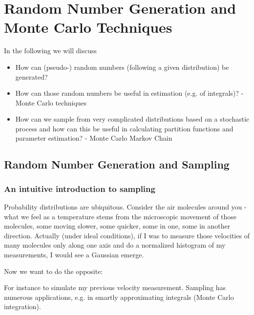 \section{Random Number Generation and Monte Carlo Techniques}
\thispagestyle{plain}

In the following we will discuss
\begin{itemize}
    \item How can (pseudo-) random numbers (following a given distribution) be generated?
    \item How can those random numbers be useful in estimation (e.g. of integrals)? - Monte Carlo techniques
    \item How can we sample from very complicated distributions based on a stochastic process and how
    can this be useful in calculating partition functions and parameter estimation? - Monte Carlo Markov Chain
\end{itemize}

\subsection{Random Number Generation and Sampling}

\subsubsection{An intuitive introduction to sampling}
Probability distributions are ubiquitous. Consider the air molecules around you - what we feel as a temperature stems from the microscopic movement of those
molecules, some moving slower, some quicker, some in one, some in another direction. Actually (under ideal conditions), if I was to measure
those velocities of many molecules only along one axis and do a normalized histogram of my measurements, I would see a Gaussian emerge.

Now we want to do the opposite: 


For instance to simulate my previous velocity measurement. Sampling has numerous
applications, e.g. in smartly approximating integrals (Monte Carlo integration).

